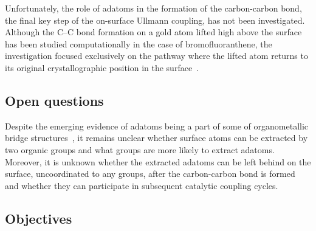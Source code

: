 \documentclass[%
 reprint,
 amsmath,amssymb,
 aps,
prb,
floatfix,
]{revtex4-2}
\newcommand{\lock}{\color{red}}
\newcommand{\lock}{\color{black}}
\begin{document}

{\lock

Unfortunately, the role of adatoms in the formation of the carbon-carbon bond, the final key step of the on-surface Ullmann coupling, has not been investigated. Although the C--C bond formation on a gold atom lifted high above the surface has been studied computationally in the case of bromofluoranthene,
the investigation focused exclusively on the pathway where the lifted atom returns to its original crystallographic position in the surface~\cite{jpcc2018}. 

}

\ifdefined\INTERNAL

\subsection{Open questions}

\fi
{\lock

Despite the emerging evidence of adatoms being a part of some of organometallic bridge structures~\cite{acsnano2017, acsnano2019}, it remains unclear whether surface atoms can be extracted by two organic groups and what groups are more likely to extract adatoms. Moreover, it is unknown whether the extracted adatoms can be left behind on the surface, uncoordinated to any groups, after the carbon-carbon bond is formed and whether they can participate in subsequent catalytic coupling cycles.


}

\ifdefined\INTERNAL

\subsection{Objectives}
\end{document}
